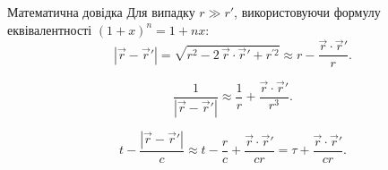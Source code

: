 \documentclass[onlytextwidth]{beamer}
\let\vect\vec
\begin{document}
\begin{frame}{Математична довідка}
	Для випадку $ r \gg r' $, використовуючи формулу еквівалентності $ (1 + x)^n = 1 + nx $:
	\begin{equation*}
		|\vect{r} - \vect{r}'|  = \sqrt{r^2 -2\, \vect{r} \cdot \vect{r}' + r^{\prime 2} } \approx r - \frac{\vect{r} \cdot \vect{r}'}{r}.
	\end{equation*}

	\begin{equation*}
		\frac1{|\vect{r} - \vect{r}'|} \approx \frac1{r} + \frac{\vect{r} \cdot \vect{r}'}{r^3}.
	\end{equation*}

	\begin{equation*}
		t - \frac{|\vect{r} - \vect{r}'|}{c} \approx t - \frac{r}{c} + \frac{\vect{r} \cdot \vect{r}'}{cr} = \tau + \frac{\vect{r} \cdot \vect{r}'}{cr}.
	\end{equation*}
\end{frame}
\end{document}
